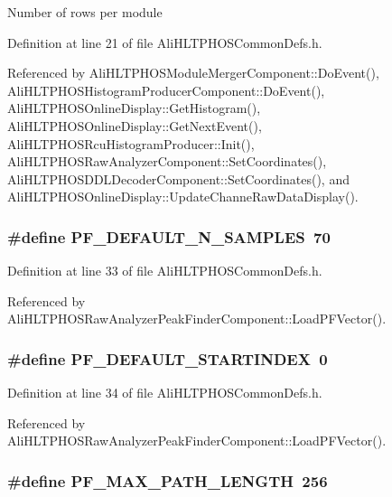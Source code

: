 Number of rows per module 

Definition at line 21 of file Ali\-HLTPHOSCommon\-Defs.h.

Referenced by Ali\-HLTPHOSModule\-Merger\-Component::Do\-Event(), Ali\-HLTPHOSHistogram\-Producer\-Component::Do\-Event(), Ali\-HLTPHOSOnline\-Display::Get\-Histogram(), Ali\-HLTPHOSOnline\-Display::Get\-Next\-Event(), Ali\-HLTPHOSRcu\-Histogram\-Producer::Init(), Ali\-HLTPHOSRaw\-Analyzer\-Component::Set\-Coordinates(), Ali\-HLTPHOSDDLDecoder\-Component::Set\-Coordinates(), and Ali\-HLTPHOSOnline\-Display::Update\-Channe\-Raw\-Data\-Display().
\subsubsection{\setlength{\rightskip}{0pt plus 5cm}\#define PF\_\-DEFAULT\_\-N\_\-SAMPLES\ 70}\label{AliHLTPHOSCommonDefs_8h_a21}




Definition at line 33 of file Ali\-HLTPHOSCommon\-Defs.h.

Referenced by Ali\-HLTPHOSRaw\-Analyzer\-Peak\-Finder\-Component::Load\-PFVector().
\subsubsection{\setlength{\rightskip}{0pt plus 5cm}\#define PF\_\-DEFAULT\_\-STARTINDEX\ 0}\label{AliHLTPHOSCommonDefs_8h_a22}




Definition at line 34 of file Ali\-HLTPHOSCommon\-Defs.h.

Referenced by Ali\-HLTPHOSRaw\-Analyzer\-Peak\-Finder\-Component::Load\-PFVector().
\subsubsection{\setlength{\rightskip}{0pt plus 5cm}\#define PF\_\-MAX\_\-PATH\_\-LENGTH\ 256}\label{AliHLTPHOSCommonDefs_8h_a19}




